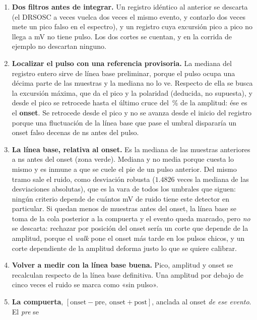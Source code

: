 \documentclass[11pt,a4paper]{article}
\begin{document}
\begin{enumerate}
\item \textbf{Dos filtros antes de integrar.} Un registro idéntico al anterior
      se descarta (el DRSOSC a veces vuelca dos veces el mismo evento, y
      contarlo dos veces mete un pico falso en el espectro), y un registro cuya
      excursión pico a pico no llega a \UmbralRuido{} mV no tiene pulso. Los dos
      cortes se cuentan, y en la corrida de ejemplo no descartan ninguno.
\item \textbf{Localizar el pulso con una referencia provisoria.} La mediana del
      registro entero sirve de línea base preliminar, porque el pulso ocupa una
      décima parte de las muestras y la mediana no lo ve. Respecto de ella se
      busca la excursión máxima, que da el pico y la polaridad (deducida, no
      supuesta), y desde el pico se retrocede hasta el último cruce del
      \FracOnset\,\% de la amplitud: ése es el \textbf{onset}. Se retrocede
      desde el pico y no se avanza desde el inicio del registro porque una
      fluctuación de la línea base que pase el umbral dispararía un onset falso
      decenas de ns antes del pulso.
\item \textbf{La línea base, relativa al onset.} Es la mediana de las muestras
      anteriores a \GuardaBase{} ns antes del onset (zona verde). Mediana y no
      media porque cuesta lo mismo y es inmune a que se cuele el pie de un
      pulso anterior. Del mismo tramo sale el ruido, como desviación robusta
      ($1.4826$ veces la mediana de las desviaciones absolutas), que es la
      vara de todos los umbrales que siguen: ningún criterio depende de cuántos
      mV de ruido tiene este detector en particular. Si quedan menos de
      \MinBase{} muestras antes del onset, la línea base se toma de la cola
      posterior a la compuerta y el evento queda marcado, pero \emph{no} se
      descarta: rechazar por posición del onset sería un corte que depende de la
      amplitud, porque el \emph{walk} pone el onset más tarde en los pulsos
      chicos, y un corte dependiente de la amplitud deforma justo lo que se
      quiere calibrar.
\item \textbf{Volver a medir con la línea base buena.} Pico, amplitud y onset
      se recalculan respecto de la línea base definitiva. Una amplitud por
      debajo de cinco veces el ruido se marca como «sin pulso».
\item \textbf{La compuerta}, $[\text{onset} - \text{pre},\ \text{onset} +
      \text{post}]$, anclada al onset \emph{de ese evento}. El \emph{pre} se

\end{enumerate}
\end{document}
